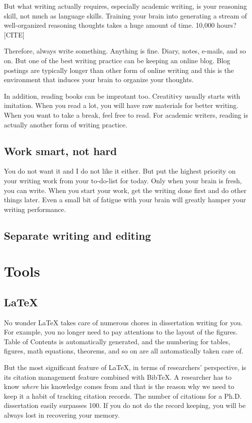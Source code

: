 \documentclass[11pt]{article}
\begin{document}
But what writing actually requires, especially academic writing, is your
reasoning skill, not much as language skills. Training your brain into
generating a stream of well-organized reasoning thoughts takes a huge amount of
time. 10,000 hours? [CITE]

Therefore, always write something. Anything is fine. Diary, notes, e-mails, and
so on. But one of the best writing practice can be keeping an online blog.
Blog postings are typically longer than other form of online writing and this is
the environment that induces your brain to organize your thoughts. 

In addition, reading books can be improtant too. Creatitivy usually starts with
imitation. When you read a lot, you will have raw materials for better writing.
When you want to take a break, feel free to read. For academic writers, reading
is actually another form of writing practice.

\subsection{Work smart, not hard}
You do not want it and I do not like it either. But put the highest priority on
your writing work from your to-do-list for today. Only when your brain is fresh,
you can write. When you start your work, get the writing done first and do other
things later. Even a small bit of fatigue with your brain will greatly hamper
your writing performance.

\subsection{Separate writing and editing}


\section{Tools}

\subsection{LaTeX}

No wonder LaTeX takes care of numerous chores in dissertation writing
for you. For example, you no longer need to pay attentions to the layout of
the figures.  Table of Contents is automatically generated, and the
numbering for tables, figures, math equations, theorems, and so on are
all automatically taken care of. 

But the most significant feature of LaTeX, in terms of researchers'
perspective, is its citation management feature combined with BibTeX. A
researcher has to know \emph{where} his knowledge comes from and that is
the reason why we need to keep it a habit of tracking citation records.
The number of citations for a Ph.D. dissertation easily surpasses 100.
If you do not do the record keeping, you will be always lost in
recovering your memory.
\end{document}
